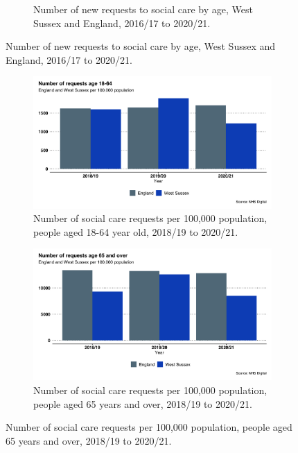 \begin{figure}
\begin{subfigure}[b]{0.49\textwidth}
        \caption{Number of new requests to social care by age, West Sussex and England, 2016/17 to 2020/21.}
        \label{fig:sc:number_of_requests_by_age}
    \end{subfigure}
\end{figure}

\begin{figure}
    \caption{Demand for social care over time, West Sussex compared to England.}\label{fig:more-sc-requests}
    \vspace*{5mm}
    \centering
    \begin{subfigure}[b]{0.49\textwidth}
        \centering
        \includegraphics[width=\textwidth]{images/sc_requests_18_to_64.png}
        \caption{Number of social care requests per 100,000 population, people aged 18-64 year old, 2018/19 to 2020/21.}
        \label{fig:sc:requests_18_64}
    \end{subfigure}
    \begin{subfigure}[b]{0.49\textwidth}
        \centering
        \includegraphics[width=\textwidth]{images/sc_requests_over_65.png}
        \caption{Number of social care requests per 100,000 population, people aged 65 years and over, 2018/19 to 2020/21.}

\end{subfigure}
\end{figure}
